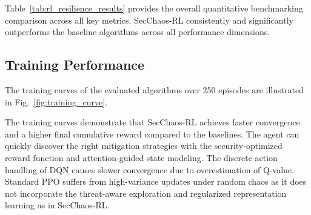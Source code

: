 \documentclass[pdflatex,sn-mathphys-num]{sn-jnl}%
\theoremstyle{thmstyleone}%
\theoremstyle{thmstyletwo}%
\theoremstyle{thmstylethree}%
\begin{document}
	Table~\ref{tab:rl_resilience_results} provides the overall quantitative benchmarking comparison across all key metrics. SecChaos-RL consistently and significantly outperforms the baseline algorithms across all performance dimensions.
	\begin{table}[h]
		\centering
		\caption{SecChaos-RL quantitative performance benchmarking over 30 random seeds.}
		\label{tab:rl_resilience_results}
	\end{table}

	
	\subsection{Training Performance}
	The training curves of the evaluated algorithms over 250 episodes are illustrated in Fig.~\ref{fig:training_curve}.
	
	The training curves demonstrate that SecChaos-RL achieves faster convergence and a higher final cumulative reward compared to the baselines. The agent can quickly discover the right mitigation strategies with the security-optimized reward function and attention-guided state modeling. The discrete action handling of DQN causes slower convergence due to overestimation of Q-value. Standard PPO suffers from high-variance updates under random chaos as it does not incorporate the threat-aware exploration and regularized representation learning as in SecChaos-RL.
	
\end{document}

